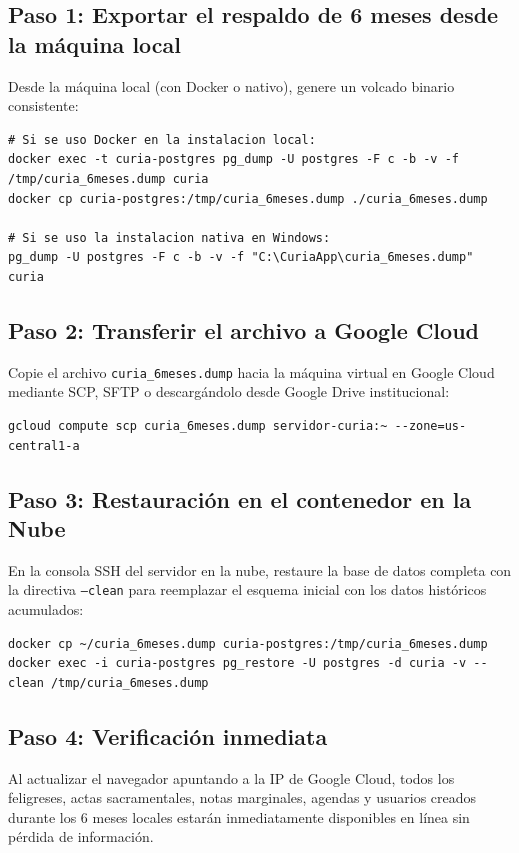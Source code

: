 \subsection{Paso 1: Exportar el respaldo de 6 meses desde la máquina local}
Desde la máquina local (con Docker o nativo), genere un volcado binario consistente:
\begin{lstlisting}[style=consola]
# Si se uso Docker en la instalacion local:
docker exec -t curia-postgres pg_dump -U postgres -F c -b -v -f /tmp/curia_6meses.dump curia
docker cp curia-postgres:/tmp/curia_6meses.dump ./curia_6meses.dump

# Si se uso la instalacion nativa en Windows:
pg_dump -U postgres -F c -b -v -f "C:\CuriaApp\curia_6meses.dump" curia
\end{lstlisting}

\subsection{Paso 2: Transferir el archivo a Google Cloud}
Copie el archivo \texttt{curia\_6meses.dump} hacia la máquina virtual en Google Cloud mediante SCP, SFTP o descargándolo desde Google Drive institucional:
\begin{lstlisting}[style=consola]
gcloud compute scp curia_6meses.dump servidor-curia:~ --zone=us-central1-a
\end{lstlisting}

\subsection{Paso 3: Restauración en el contenedor en la Nube}
En la consola SSH del servidor en la nube, restaure la base de datos completa con la directiva \texttt{--clean} para reemplazar el esquema inicial con los datos históricos acumulados:
\begin{lstlisting}[style=consola]
docker cp ~/curia_6meses.dump curia-postgres:/tmp/curia_6meses.dump
docker exec -i curia-postgres pg_restore -U postgres -d curia -v --clean /tmp/curia_6meses.dump
\end{lstlisting}

\subsection{Paso 4: Verificación inmediata}
Al actualizar el navegador apuntando a la IP de Google Cloud, todos los feligreses, actas sacramentales, notas marginales, agendas y usuarios creados durante los 6 meses locales estarán inmediatamente disponibles en línea sin pérdida de información.

